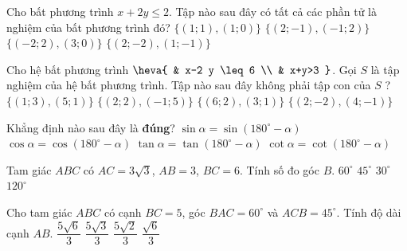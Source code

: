 \begin{ex}%
Cho bất phương trình $x+2 y \leq 2$. Tập nào sau đây có tất cả các phần tử là nghiệm của bất phương trình đó?
\choice
{$\{(1 ; 1),(1 ; 0)\}$}
{$\{(2 ;-1),(-1 ; 2)\}$}
{$\{(-2 ; 2),(3 ; 0)\}$}
{\True $\{(2 ;-2),(1 ;-1)\}$}
\end{ex}

\begin{ex}%
Cho hệ bất phương trình $\heva{
	& x-2 y \leq 6 \\
	& x+y>3
}$. Gọi $S$ là tập nghiệm của hệ bất phương trình. Tập nào sau đây không phải tập con của $S$ ?
\choice
{$\{(1 ; 3),(5 ; 1)\}$}
{$\{(2 ; 2),(-1 ; 5)\}$}
{$\{(6 ; 2),(3 ; 1)\}$}
{\True $\{(2 ;-2),(4 ;-1)\}$}
\end{ex}

\begin{ex}%
Khẳng định nào sau đây là \textbf{đúng}?
\choice
{\True $\sin \alpha=\sin \left(180^{\circ}-\alpha\right)$}
{$\cos \alpha=\cos \left(180^{\circ}-\alpha\right)$}
{$\tan \alpha=\tan \left(180^{\circ}-\alpha\right)$}
{$\cot \alpha=\cot \left(180^{\circ}-\alpha\right)$}
	\loigiai{
	}
\end{ex}

\begin{ex}%
Tam giác $A B C$ có $A C=3 \sqrt{3}$, $A B=3$, $B C=6$. Tính số đo góc $B$.
	\choice
{\True $60^{\circ}$}
 {$45^{\circ}$}
{$30^{\circ}$}
{$120^{\circ}$}
\end{ex}

\begin{ex}%
Cho tam giác $A B C$ có cạnh $B C=5$, góc $B A C=60^{\circ}$ và $A C B=45^{\circ}$. Tính độ dài cạnh $A B$.
\choice
{\True $\dfrac{5 \sqrt{6}}{3}$}
 {$\dfrac{5 \sqrt{3}}{3}$}
{$\dfrac{5 \sqrt{2}}{3}$}
{$\dfrac{\sqrt{6}}{3}$}
\end{ex}

